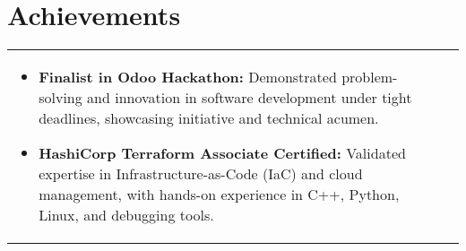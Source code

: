 \documentclass[a4paper,10pt]{article}
\begin{document}
\section{Achievements}

\begin{tabularx}{\linewidth}{ @{}l r@{} }
\begin{minipage}[t]{\linewidth}
\begin{itemize}[nosep,after=\strut, leftmargin=2em]
\item \textbf{Finalist in Odoo Hackathon:} Demonstrated problem-solving and innovation in software development under tight deadlines, showcasing initiative and technical acumen. 
\item \textbf{HashiCorp Terraform Associate Certified:} Validated expertise in Infrastructure-as-Code (IaC) and cloud management, with hands-on experience in C++, Python, Linux, and debugging tools.
\end{itemize}
\end{minipage}
\end{tabularx}
\end{document}
